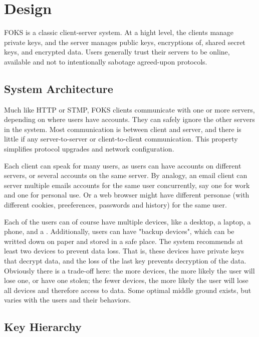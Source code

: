 
\section{Design}

FOKS is a classic client-server system. At a hight level, the clients
manage private keys, and the server manages public keys, encryptions of, 
shared secret keys, and encrypted data. Users generally trust their
servers to be online, available and not to intentionally sabotage
agreed-upon protocols. 

\subsection{System Architecture}

Much like HTTP or STMP, FOKS clients communicate with one or more servers,
depending on where users have accounts. They can safely ignore the other servers
in the system. Most communication is between client and server, and there is
little if any server-to-server or client-to-client communication.  This
property simplifies protocol upgrades and network configuration.

Each client can speak for many users, as users can have accounts on different
servers, or several accounts on the same server. By analogy, an email client can
server multiple emails accounts for the same user concurrently, say one for work
and one for personal use. Or a web browser might have different personae (with
different cookies, preeferences, passwords and history) for the same user.

Each of the users can of course have multiple devices, like a desktop, a laptop,
a phone, and a \yubi . Additionally, users can have "backup devices", which can
be writted down on paper and stored in a safe place. The system recommends at
least two devices to prevent data loss. That is, these devices have private keys
that decrypt data, and the loss of the last key prevents decryption of the data.
Obviously there is a trade-off here: the more devices, the more likely the user
will lose one, or have one stolen; the fewer devices, the more likely the user
will lose all devices and therefore access to data. Some optimal middle ground
exists, but varies with the users and their behaviors. 

\subsection{Key Hierarchy}

